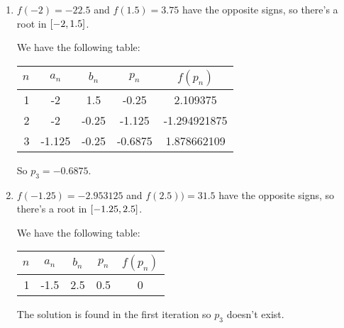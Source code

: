 \documentclass[../../Assignments.tex]{subfiles}
\begin{document}
\begin{solution}
    \begin{enumerate}[label = (\alph*)]
        \item \(f(-2) = \num{-22.5}\) and \(f(\num{1.5}) = \num{3.75}\) have the
            opposite signs, so there's a root in \(\interval{-2}{\num{1.5}}\).

            We have the following table:

            \begin{table}[hbt!]
                \centering
                \begin{tabular}{r S[table-format=-1.3] S[table-format=-1.2] S[table-format=-1.4] S[table-format=-1.9]}
                    \toprule
                    \(n\)  &  {\(a_n\)}  &  {\(b_n\)}  &  {\(p_n\)}  &  {\(f(p_n)\)}  \\
                      &  -2         &   1.5       &  -0.25      &   2.109375     \\
                        2  &  -2         &  -0.25      &  -1.125     &  -1.294921875  \\
                        3  &  -1.125     &  -0.25      &  -0.6875    &   1.878662109  \\
                    \bottomrule
                \end{tabular}
            \end{table}

            So \(p_3 = \num{-0.6875}\).

        \item \(f(\num{-1.25}) = \num{-2.953125}\) and \(f(\num{2.5})) =
            \num{31.5}\) have the opposite signs, so there's a root in
            \(\interval{\num{-1.25}}{\num{2.5}}\).

            We have the following table:

            \begin{table}[hbt!]
                \centering
                \begin{tabular}{r S[table-format=-1.1] S[table-format=-1.1] S[table-format=1.1] S[table-format=1.1]}
                    \toprule
                    \(n\)  &  {\(a_n\)}  &  {\(b_n\)}  &  {\(p_n\)}  &  {\(f(p_n)\)}  \\
                       &  -1.5       &   2.5       &   0.5       &   0            \\
                    \bottomrule
                \end{tabular}
            \end{table}

            The solution is found in the first iteration so \(p_3\) doesn't
            exist.
    \end{enumerate}
\end{solution}
\end{document}
